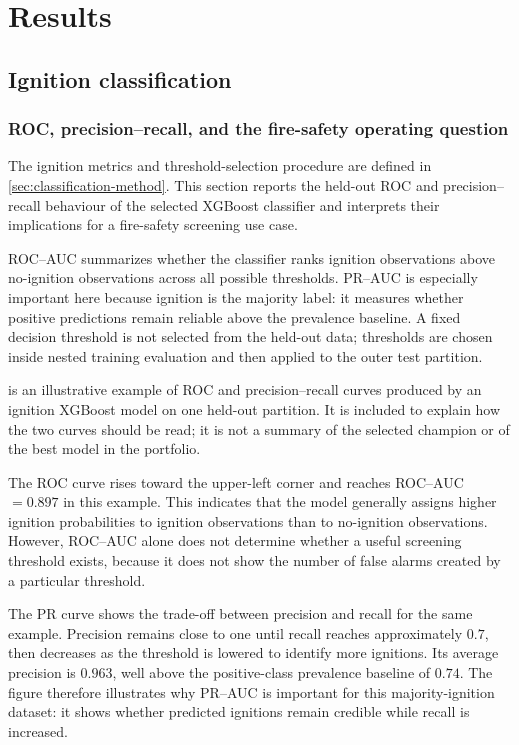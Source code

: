 \chapter{Results}
\label{chap:results}

\section{Ignition classification}
\label{sec:results-ignition}

\subsection{ROC, precision--recall, and the fire-safety operating question}
\label{sec:ignition-auc}
The ignition metrics and threshold-selection procedure are defined in
\cref{sec:classification-method}. This section reports the held-out ROC and
precision--recall behaviour of the selected XGBoost classifier and interprets
their implications for a fire-safety screening use case.

ROC--AUC summarizes whether the classifier ranks ignition observations above
no-ignition observations across all possible thresholds. PR--AUC is especially
important here because ignition is the majority label: it measures whether
positive predictions remain reliable above the prevalence baseline. A fixed
decision threshold is not selected from the held-out data; thresholds are
chosen inside nested training evaluation and then applied to the outer test
partition.

 is an illustrative example of ROC and
precision--recall curves produced by an ignition XGBoost model on one held-out
partition. It is included to explain how the two curves should be read; it is
not a summary of the selected champion or of the best model in the portfolio.

The ROC curve rises toward the upper-left corner and reaches ROC--AUC
\(=0.897\) in this example. This indicates that the model generally assigns
higher ignition probabilities to ignition observations than to no-ignition
observations. However, ROC--AUC alone does not determine whether a useful
screening threshold exists, because it does not show the number of false alarms
created by a particular threshold.

The PR curve shows the trade-off between precision and recall for the same
example. Precision remains close to one until recall reaches approximately
\(0.7\), then decreases as the threshold is lowered to identify more
ignitions. Its average precision is \(0.963\), well above the positive-class
prevalence baseline of \(0.74\). The figure therefore illustrates why PR--AUC
is important for this majority-ignition dataset: it shows whether predicted
ignitions remain credible while recall is increased.

